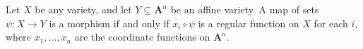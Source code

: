 Let $X$ be any variety, and let $Y \subseteq \mathbf{A}^n$ be an affine variety. A map of sets $\psi: X \to Y$ is a morphism if and only if $x_i \circ \psi$ is a regular function on $X$ for each $i$, where $x_1, \ldots, x_n$ are the coordinate functions on $\mathbf{A}^n$.
